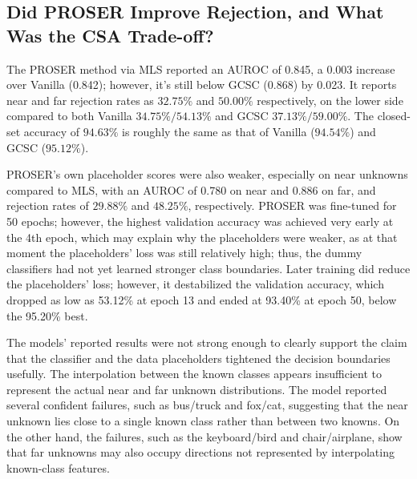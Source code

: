 \subsection{Did PROSER Improve Rejection, and What Was the CSA Trade-off?}

The PROSER method via MLS reported an AUROC of 0.845, a 0.003 increase over Vanilla (0.842); however, it's still below GCSC (0.868) by 0.023. It reports near and far rejection rates as \(32.75\%\) and \(50.00\%\) respectively, on the lower side compared to both Vanilla \(34.75\%/54.13\%\) and GCSC \(37.13\%/59.00\%\). The closed-set accuracy of \(94.63\%\) is roughly the same as that of Vanilla (\(94.54\%\)) and GCSC (\(95.12\%\)).

PROSER's own placeholder scores were also weaker, especially on near unknowns compared to MLS, with an AUROC of 0.780 on near and 0.886 on far, and rejection rates of \(29.88\%\) and \(48.25\%\), respectively. PROSER was fine-tuned for 50 epochs; however, the highest validation accuracy was achieved very early at the 4th epoch, which may explain why the placeholders were weaker, as at that moment the placeholders' loss was still relatively high; thus, the dummy classifiers had not yet learned stronger class boundaries. Later training did reduce the placeholders' loss; however, it destabilized the validation accuracy, which dropped as low as 53.12\% at epoch 13 and ended at 93.40\% at epoch 50, below the 95.20\% best.

The models' reported results were not strong enough to clearly support the claim that the classifier and the data placeholders tightened the decision boundaries usefully. The interpolation between the known classes appears insufficient to represent the actual near and far unknown distributions. The model reported several confident failures, such as bus/truck and fox/cat, suggesting that the near unknown lies close to a single known class rather than between two knowns. On the other hand, the failures, such as the keyboard/bird and chair/airplane, show that far unknowns may also occupy directions not represented by interpolating known-class features.
